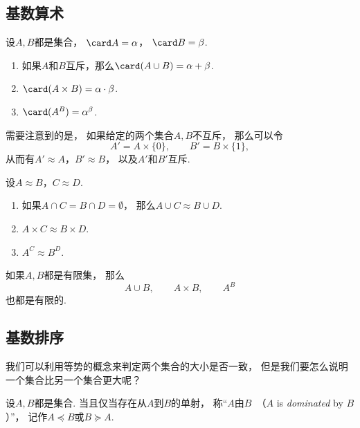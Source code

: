 \subsection{基数算术}
\begin{definition}
设\(A,B\)都是集合，
\(\card A = \alpha\)，
\(\card B = \beta\).
\begin{enumerate}
	\item 如果\(A\)和\(B\)互斥，那么\(\card(A \cup B)=\alpha+\beta\).
	\item \(\card(A \times B)=\alpha\cdot\beta\).
	\item \(\card(A^B)=\alpha^\beta\).
\end{enumerate}
\end{definition}

需要注意到的是，
如果给定的两个集合\(A,B\)不互斥，
那么可以令\[
	A' = A\times\{0\}, \qquad
	B' = B\times\{1\},
\]
从而有\(A' \approx A\)，\(B' \approx B\)，
以及\(A'\)和\(B'\)互斥.

\begin{theorem}
设\(A \approx B\)，\(C \approx D\).
\begin{enumerate}
	\item 如果\(A \cap C = B \cap D = \emptyset\)，
	那么\(A \cup C \approx B \cup D\).
	\item \(A \times C \approx B \times D\).
	\item \(A^C \approx B^D\).
\end{enumerate}
\end{theorem}

\begin{theorem}
如果\(A,B\)都是有限集，
那么\[
	A \cup B, \qquad
	A \times B, \qquad
	A^B
\]也都是有限的.
\end{theorem}

\subsection{基数排序}
我们可以利用等势的概念来判定两个集合的大小是否一致，
但是我们要怎么说明一个集合比另一个集合更大呢？

\begin{definition}
设\(A,B\)都是集合.
当且仅当存在从\(A\)到\(B\)的单射，
称“\(A\)由\(B\)~（\(A\) is \emph{dominated} by \(B\)）”，
记作\(A \preceq B\)或\(B \succeq A\).
\end{definition}

